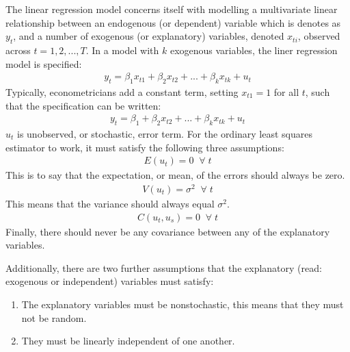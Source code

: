 \documentclass[letterpaper,10pt,english]{jupyterBook}
\begin{document}
The linear regression model concerns itself with modelling a multivariate linear relationship between an endogenous (or dependent) variable which is denotes as \(y_t\), and a number of exogenous (or explanatory) variables, denoted \(x_{ti}\), observed across \(t = 1, 2, ... , T\). In a model with \(k\) exogenous variables, the liner regression model is specified:
\begin{equation*}
\begin{split} y_t = \beta_1 x_{t1} + \beta_2 x_{t2} + ... + \beta_{k} x_{tk} + u_t\end{split}
\end{equation*}
Typically, econometricians add a constant term, setting \(x_{t1} = 1\) for all \(t\), such that the specification can be written:
\begin{equation*}
\begin{split} y_t = \beta_1 + \beta_2 x_{t2} + ... + \beta_{k} x_{tk} + u_t\end{split}
\end{equation*}
\(u_t\) is unobserved, or stochastic, error term. For the ordinary least squares estimator to work, it must satisfy the following three assumptions:
\begin{equation*}
\begin{split}E(u_t) = 0 \;\; \forall \; t\end{split}
\end{equation*}
This is to say that the expectation, or mean, of the errors should always be zero.
\begin{equation*}
\begin{split}V(u_t) = \sigma^2 \;\; \forall \; t\end{split}
\end{equation*}
This means that the variance should always equal \(\sigma^2\).
\begin{equation*}
\begin{split}C(u_t, u_s) = 0 \;\; \forall \; t\end{split}
\end{equation*}
Finally, there should never be any covariance between any of the explanatory variables.

Additionally, there are two further assumptions that the explanatory (read: exogenous or independent) variables must satisfy:
\begin{enumerate}
%
\item {} 
The explanatory variables must be nonstochastic, this means that they must not be random.

\item {} 
They must be linearly independent of one another.

\end{enumerate}
\end{document}
